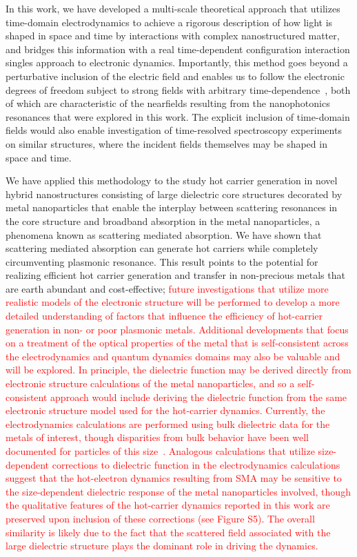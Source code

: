 \documentclass[journal=jpclcd,manuscript=article]{achemso}
\begin{document}
In this work, we have developed a multi-scale theoretical approach that utilizes time-domain electrodynamics to achieve a rigorous description of 
how light is shaped in space and time by interactions with complex nanostructured matter, and bridges this information with a real 
time-dependent configuration interaction singles approach to electronic dynamics.  Importantly, this method goes beyond a perturbative 
inclusion of the electric field and enables us to follow the electronic degrees of freedom subject to strong fields with 
arbitrary time-dependence~\cite{KKS_JCP_2005,GHP_PRA_2010,DPG_PRL_2011}, both of which are characteristic of the nearfields 
resulting from the nanophotonics resonances that were explored in this work.  The explicit inclusion of time-domain fields would 
also enable investigation of time-resolved spectroscopy experiments on similar structures, where the incident fields themselves may be shaped in space and time.  

We have applied this methodology to the study hot carrier generation in novel hybrid nanostructures consisting of large dielectric 
core structures decorated by metal nanoparticles that enable the interplay between scattering resonances in the core 
structure and broadband absorption in the metal nanoparticles, a phenomena known as scattering mediated absorption.  
We have shown that scattering mediated absorption can generate hot carriers while completely circumventing plasmonic resonance.  
This result points to the potential for realizing efficient hot carrier generation and transfer in non-precious metals that are 
earth abundant and cost-effective; \textcolor{red}{future investigations that utilize
more realistic models of the electronic structure will be performed to develop a more detailed
understanding of factors that influence the efficiency of hot-carrier generation in non- or poor plasmonic metals.
Additional developments that focus on a treatment of the optical properties
of the metal that is self-consistent across the electrodynamics and quantum dynamics domains may also be valuable and will be explored.  In principle, the dielectric function may be derived directly from electronic structure calculations of
the metal nanoparticles, and so a self-consistent approach would include deriving the dielectric
function from the same electronic structure model used for the hot-carrier dynamics.  Currently, the electrodynamics
calculations are performed using bulk dielectric data for the metals of interest, though disparities
from bulk behavior have been well documented for particles of this size~\cite{KS_JCP_1983,CTP_3,SKD_Nature_2012,CTP}.
Analogous calculations that utilize size-dependent corrections to
dielectric function in the electrodynamics calculations suggest that the hot-electron dynamics
resulting from SMA may be sensitive to the size-dependent dielectric response of the metal nanoparticles involved,
though the qualitative features of the hot-carrier dynamics reported in this work
are preserved upon inclusion of these corrections (see Figure S5).  The overall similarity 
is likely due to the fact that the scattered field associated with the large dielectric
structure plays the dominant role in driving the dynamics.}   
\end{document}
